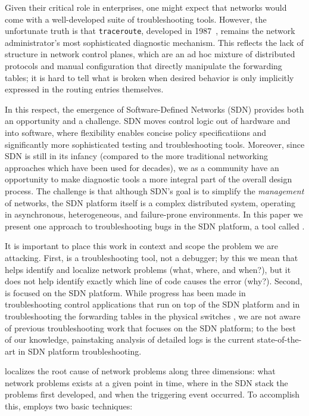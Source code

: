 Given their critical role in enterprises, one might expect that networks
would come with a well-developed suite of troubleshooting tools. However,
the unfortunate truth is that {\tt traceroute}, developed in 1987~\cite{traceroute},
remains the network administrator's most sophisticated diagnostic mechanism. This reflects
the lack of structure in network control planes, which are an ad hoc mixture of
distributed protocols and manual configuration that directly manipulate the forwarding tables; it is hard to tell what is broken
when desired behavior is only implicitly expressed in the routing entries themselves.

In this respect, the emergence of Software-Defined
Networks (SDN) provides both an opportunity and a challenge. SDN moves control logic out of hardware and into software, where
flexibility enables concise policy specificatiions and significantly more sophisticated testing and troubleshooting tools. Moreover, since SDN
is still in its infancy (compared to the more traditional networking approaches which have been
used for decades), we as a community have an opportunity to make diagnostic tools
a more integral part of the overall design process. The challenge is that although SDN's goal is to simplify the
{\em management} of networks, the SDN platform itself is a complex distributed system, operating in asynchronous, heterogeneous, and failure-prone environments.
In this paper we present one approach to troubleshooting bugs in the SDN platform, a tool called \projectname{}.

It is important to place this work in context and scope the problem we are
attacking. First, \projectname{} is a troubleshooting tool, not a debugger; by
this we mean that \projectname{} helps identify and localize network
problems (what, where, and when?), but it does not help identify exactly which
line of code causes the error (why?). Second, \projectname{} is focused on the SDN platform. While progress has been made in troubleshooting control
applications that run on top of the SDN platform \cite{nice} and in troubleshooting the forwarding tables in the physical switches \cite{anteater,hsa}, we  
are not aware of previous troubleshooting work that focuses on the SDN platform; to the best of our knowledge, painstaking analysis of detailed logs is the current state-of-the-art in SDN platform troubleshooting. 

\projectname{} localizes the root cause
of network problems along three dimensions: what network problems exists at a
given point in time, where in the SDN stack the problems first developed, and when the triggering event occurred. To accomplish this, 
\projectname{} employs two basic techniques:


